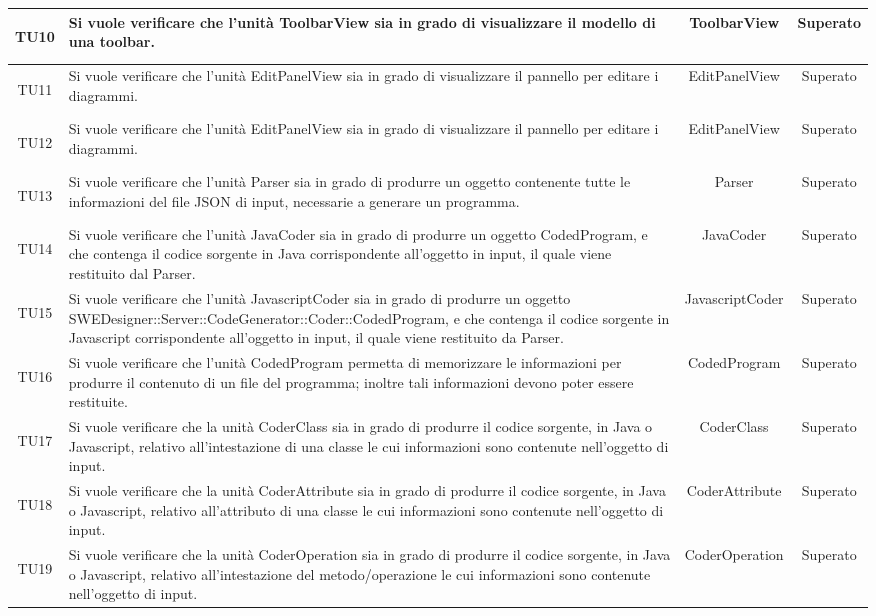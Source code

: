\documentclass[../PianoDiQualifica.tex]{subfiles}
\begin{document}
\begin{longtable}{|c|>{\centering}p{8cm}|c|c|}
		\hypertarget{TU10}{TU10}&Si vuole verificare che l'unità ToolbarView sia in grado di visualizzare il modello di una toolbar.&ToolbarView&Superato\\
		\hline
		\hypertarget{TU11}{TU11}&Si vuole verificare che l'unità EditPanelView sia in grado di visualizzare il pannello per editare i diagrammi.&EditPanelView&Superato\\
		\hline
		\hypertarget{TU12}{TU12}& Si vuole verificare che l'unità EditPanelView sia in grado di visualizzare il pannello per editare i diagrammi.& EditPanelView &Superato\\
		\hline
		\hypertarget{TU13}{TU13}&Si vuole verificare che l'unità Parser sia in grado di produrre un oggetto contenente tutte le informazioni del file JSON di input, necessarie a generare un programma. &Parser &Superato\\
		\hline
		\hypertarget{TU14}{TU14}& Si vuole verificare che l'unità JavaCoder sia in grado di produrre un oggetto CodedProgram, e che contenga il codice sorgente in Java corrispondente all'oggetto in input, il quale viene restituito dal Parser.&JavaCoder &Superato\\
		\hline
		\hypertarget{TU15}{TU15}& Si vuole verificare che l'unità JavascriptCoder sia in grado di produrre un oggetto SWEDesigner::Server::CodeGenerator::Coder::CodedProgram, e che contenga il codice sorgente in Javascript corrispondente all'oggetto in input, il quale viene restituito da Parser.&JavascriptCoder &Superato\\
		\hline
		\hypertarget{TU16}{TU16}& Si vuole verificare che l'unità CodedProgram permetta di memorizzare le informazioni per produrre il contenuto di un file del programma; inoltre tali informazioni devono poter essere restituite.& CodedProgram &Superato\\
		\hline
		\hypertarget{TU17}{TU17}& Si vuole verificare che la unità CoderClass sia in grado di produrre il codice sorgente, in Java o Javascript, relativo all'intestazione di una classe le cui informazioni sono contenute nell'oggetto di input.&CoderClass &Superato\\
		\hline
		\hypertarget{TU18}{TU18}& Si vuole verificare che la unità CoderAttribute sia in grado di produrre il codice sorgente, in Java o Javascript, relativo all'attributo di una classe le cui informazioni sono contenute nell'oggetto di input.&CoderAttribute &Superato\\
		\hline
		\hypertarget{TU19}{TU19}& Si vuole verificare che la unità CoderOperation sia in grado di produrre il codice sorgente, in Java o Javascript, relativo all'intestazione del metodo/operazione le cui informazioni sono contenute nell'oggetto di input.& CoderOperation &Superato\\

\end{longtable}
\end{document}
